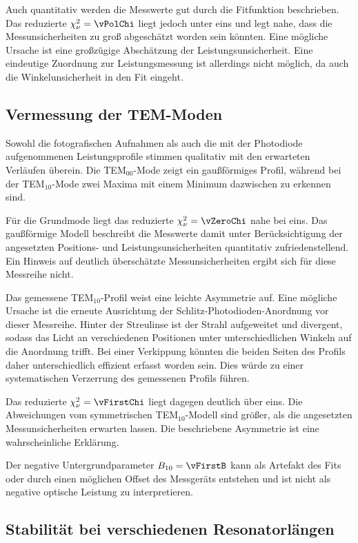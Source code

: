 Auch quantitativ werden die Messwerte gut durch die Fitfunktion beschrieben.
Das reduzierte $\chi^2_\nu=\vPolChi$ liegt jedoch unter eins und legt nahe,
dass die Messunsicherheiten zu groß abgeschätzt worden sein könnten.
Eine mögliche Ursache ist eine großzügige Abschätzung der Leistungsunsicherheit.
Eine eindeutige Zuordnung zur Leistungsmessung ist allerdings nicht möglich,
da auch die Winkelunsicherheit in den Fit eingeht.

\subsection{Vermessung der TEM-Moden}

Sowohl die fotografischen Aufnahmen als auch die mit der Photodiode
aufgenommenen Leistungsprofile stimmen qualitativ mit den erwarteten
Verläufen überein. Die TEM$_{00}$-Mode zeigt ein gaußförmiges Profil,
während bei der TEM$_{10}$-Mode zwei Maxima mit einem Minimum dazwischen
zu erkennen sind.

Für die Grundmode liegt das reduzierte $\chi^2_\nu=\vZeroChi$ nahe
bei eins. Das gaußförmige Modell beschreibt die Messwerte damit unter
Berücksichtigung der angesetzten Positions- und Leistungsunsicherheiten
quantitativ zufriedenstellend. Ein Hinweis auf deutlich überschätzte
Messunsicherheiten ergibt sich für diese Messreihe nicht.

Das gemessene TEM$_{10}$-Profil weist eine leichte Asymmetrie auf.
Eine mögliche Ursache ist die erneute Ausrichtung der Schlitz-Photodioden-Anordnung
vor dieser Messreihe. Hinter der Streulinse ist der Strahl aufgeweitet und
divergent, sodass das Licht an verschiedenen Positionen unter unterschiedlichen
Winkeln auf die Anordnung trifft. Bei einer Verkippung könnten die beiden
Seiten des Profils daher unterschiedlich effizient erfasst worden sein.
Dies würde zu einer systematischen Verzerrung des gemessenen Profils führen.

Das reduzierte $\chi^2_\nu=\vFirstChi$ liegt dagegen deutlich über eins.
Die Abweichungen vom symmetrischen TEM$_{10}$-Modell sind größer, als die
angesetzten Messunsicherheiten erwarten lassen. Die beschriebene
Asymmetrie ist eine wahrscheinliche Erklärung.

Der negative Untergrundparameter $B_{10}=\vFirstB$ kann als Artefakt des Fits
oder durch einen möglichen Offset des Messgeräts entstehen und ist nicht
als negative optische Leistung zu interpretieren.

\subsection{Stabilität bei verschiedenen Resonatorlängen}

